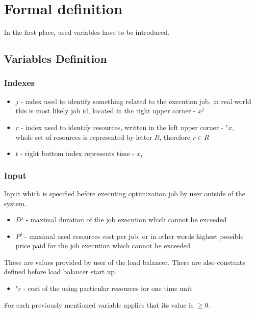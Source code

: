 
\section{Formal definition}\label{sec:formal-definition}
In the first place, used variables have to be introduced.

\subsection{Variables Definition}\label{subsec:variables-definition}

\subsubsection{Indexes}
\begin{itemize}
	\item $j$ - index used to identify something related to the execution job, in real world this is most likely job id, located in the right upper corner - $x^{j}$
	\item $r$ - index used to identify resources, written in the left upper corner - ${}^{r}x$, whole set of resources is represented by letter $R$, therefore $r \in R$
	\item $t$ - right bottom index represents time - $x_t$
\end{itemize}

\subsubsection{Input}
Input which is specified before executing optimization job by user outside of the system.

\begin{itemize}
	\item $D^{j}$ - maximal duration of the job execution which cannot be exceeded
	\item $P^{j}$ - maximal used resources cost per job, or in other words highest possible price paid for the job execution which cannot be exceeded
\end{itemize}
These are values provided by user of the load balancer.
There are also constants defined before load balancer start up.
\begin{itemize}
	\item ${}^{r}c$ - cost of the using particular resources for one time unit
\end{itemize}
For each previously mentioned variable applies that its value is $\geq 0$.

